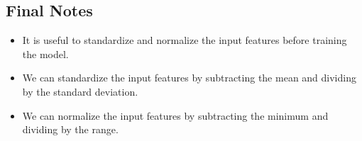 \documentclass[12pt]{article}
\begin{document}
        \subsection{Final Notes}
            \begin{itemize}
                \item It is useful to standardize and normalize the input features before training the model.
                \item We can standardize the input features by subtracting the mean and dividing by the standard deviation.
                \item We can normalize the input features by subtracting the minimum and dividing by the range.
            \end{itemize}
\end{document}
